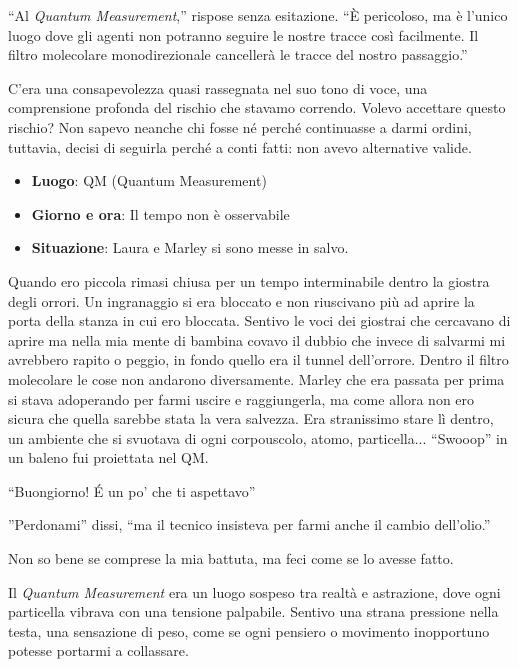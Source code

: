 \begin{dialogue}
 ``Al \textit{Quantum Measurement},'' rispose  senza esitazione. ``È pericoloso, ma è l'unico luogo dove gli agenti non potranno seguire le nostre tracce così facilmente. Il filtro molecolare monodirezionale cancellerà le tracce del nostro passaggio.''
\end{dialogue}
 C'era una consapevolezza quasi rassegnata nel suo tono di voce, una comprensione profonda del rischio che stavamo correndo. Volevo accettare questo rischio? Non sapevo neanche chi fosse né perché continuasse a darmi ordini, tuttavia, decisi di seguirla perché a conti fatti: non avevo alternative valide.
\begin{tcolorbox}[colback=gray!5,colframe=gray!80,title=\textbf{Scheda Informativa}]
\begin{itemize}
    \item \textbf{Luogo}: QM (Quantum Measurement)
    \item \textbf{Giorno e ora}: Il tempo non è osservabile
    \item \textbf{Situazione}: Laura e Marley si sono messe in salvo.
\end{itemize}
\end{tcolorbox}
Quando ero piccola rimasi chiusa per un tempo interminabile dentro la giostra degli orrori. Un ingranaggio si era bloccato e non riuscivano più ad aprire la porta della stanza in cui ero bloccata.
Sentivo le voci dei giostrai che cercavano di aprire ma nella mia mente di bambina covavo il dubbio che invece di salvarmi mi avrebbero rapito o peggio, in fondo quello era il tunnel dell'orrore.
Dentro il filtro molecolare le cose non andarono diversamente. Marley che era passata per prima si stava adoperando per farmi uscire e raggiungerla, ma come allora non ero sicura che quella sarebbe stata la vera salvezza. Era stranissimo stare lì dentro, un ambiente che si svuotava di ogni corpouscolo, atomo, particella... ``Swooop'' in un baleno fui proiettata nel QM.

\begin{dialogue}
 ``Buongiorno! \'E un po' che ti aspettavo''
\end{dialogue}
\begin{dialogue}
''Perdonami'' dissi, ``ma il tecnico insisteva per farmi anche il cambio dell'olio.''
\end{dialogue}
Non so bene se comprese la mia battuta, ma feci come se lo avesse fatto.

 Il \textit{Quantum Measurement} era un luogo sospeso tra realtà e astrazione, dove ogni particella vibrava con una tensione palpabile. Sentivo una strana pressione nella testa, una sensazione di peso, come se ogni pensiero o movimento inopportuno potesse portarmi a collassare.

